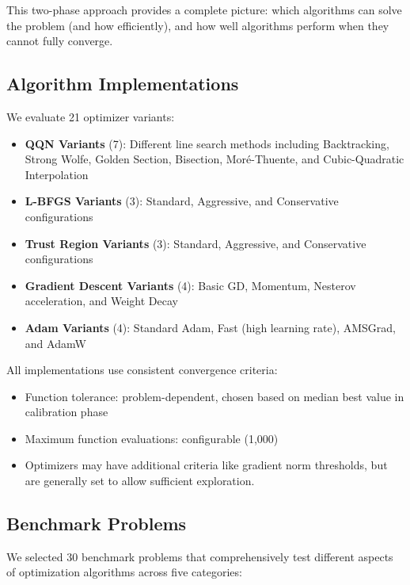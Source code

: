 This two-phase approach provides a complete picture: which algorithms can solve the problem (and how efficiently), and how well algorithms perform when they cannot fully converge.

\hypertarget{algorithm-implementations}{%
\subsection{Algorithm Implementations}\label{algorithm-implementations}}

We evaluate 21 optimizer variants:

\begin{itemize}
\tightlist
\item
  \textbf{QQN Variants} (7): Different line search methods including Backtracking, Strong Wolfe, Golden Section, Bisection, Moré-Thuente, and Cubic-Quadratic Interpolation
\item
  \textbf{L-BFGS Variants} (3): Standard, Aggressive, and Conservative configurations
\item
  \textbf{Trust Region Variants} (3): Standard, Aggressive, and Conservative configurations
\item
  \textbf{Gradient Descent Variants} (4): Basic GD, Momentum, Nesterov acceleration, and Weight Decay
\item
  \textbf{Adam Variants} (4): Standard Adam, Fast (high learning rate), AMSGrad, and AdamW
\end{itemize}

All implementations use consistent convergence criteria:

\begin{itemize}
\tightlist
\item
  Function tolerance: problem-dependent, chosen based on median best value in calibration phase
\item
  Maximum function evaluations: configurable (1,000)
\item
  Optimizers may have additional criteria like gradient norm thresholds, but are generally set to allow sufficient exploration.
\end{itemize}

\hypertarget{benchmark-problems}{%
\subsection{Benchmark Problems}\label{benchmark-problems}}

We selected 30 benchmark problems that comprehensively test different aspects of optimization algorithms across five categories:

